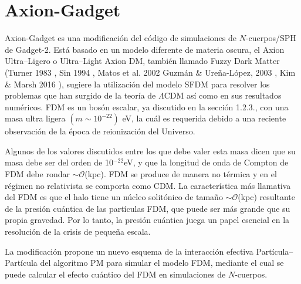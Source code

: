 \documentclass[a4paper,openright,12pt]{book}
\begin{document}
\begin{figure}
\end{figure}

\section{Axion-Gadget}
Axion-Gadget \cite{3.1} es una modificación del código de simulaciones de $N$-cuerpos/SPH de Gadget-2. Está basado en un modelo diferente de materia oscura, el Axion Ultra--Ligero o Ultra--Light Axion DM, también llamado Fuzzy Dark Matter (Turner 1983 \cite{3.1.1}, Sin 1994 \cite{3.1.2}, Matos et al. 2002 \cite{3.1.3} Guzmán \& Ureña-López, 2003 \cite{3.1.4}, Kim \& Marsh 2016 \cite{3.1.5}), sugiere la utilización del modelo SFDM para resolver los problemas que han surgido de la teoría de $\Lambda$CDM así como en sus resultados numéricos. FDM es un bosón escalar, ya discutido en la sección 1.2.3., con una masa ultra ligera $(m \sim 10^{-22})$ eV, la cuál es requerida debido a una reciente observación de la época de reionización del Universo. 

Algunos de los valores discutidos entre los que debe valer esta masa dicen que su masa debe ser del orden de 10$^{-22}$eV, y que la longitud de onda de Compton de FDM debe rondar $\sim \mathcal{O}$(kpc). FDM se produce de manera no térmica y en el régimen no relativista se comporta como CDM. La característica más llamativa del FDM es que el halo tiene un núcleo solitónico de tamaño $\sim \mathcal{O} $(kpc) resultante de la presión cuántica de las partículas FDM, que puede ser más grande que su propia gravedad. Por lo tanto, la presión cuántica juega un papel esencial en la resolución de la crisis de pequeña escala. 

La modificación propone un nuevo esquema de la interacción efectiva Partícula--Partícula del algoritmo PM para simular el modelo FDM, mediante el cual se puede calcular el efecto cuántico del FDM en simulaciones de $N$-cuerpos.
\end{document}
